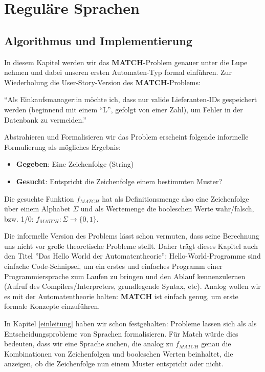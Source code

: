 \chapter{Reguläre Sprachen}
\section{Algorithmus und Implementierung}
In diesem Kapitel werden wir das \textbf{MATCH}-Problem genauer unter die Lupe nehmen
und dabei unseren ersten Automaten-Typ formal einführen.
Zur Wiederholung die User-Story-Version des \textbf{MATCH}-Problems:
\begin{center}
``Als Einkaufsmanager:in möchte ich, dass nur valide Lieferanten-IDs gespeichert werden
(beginnend mit einem ``L'', gefolgt von einer Zahl),
um Fehler in der Datenbank zu vermeiden.''
\end{center}
Abstrahieren und Formalisieren wir das Problem erscheint folgende informelle Formulierung
als mögliches Ergebnis:
\begin{itemize}
\item \textbf{Gegeben}: Eine Zeichenfolge (String)
\item \textbf{Gesucht}: Entspricht die Zeichenfolge einem bestimmten Muster?
\end{itemize}
Die gesuchte Funktion $f_{MATCH}$ hat als Definitionsmenge also eine Zeichenfolge
über einem Alphabet $\Sigma$ und als Wertemenge die booleschen Werte wahr/falsch,
bzw. 1/0: $f_{MATCH}: \Sigma \rightarrow \{0,1\}$.

Die informelle Version des Problems lässt schon vermuten,
dass seine Berechnung uns nicht vor große theoretische Probleme stellt.
Daher trägt dieses Kapitel auch den Titel ''Das Hello World der Automatentheorie'':
Hello-World-Programme sind einfache Code-Schnipsel,
um ein erstes und einfaches Programm einer Programmiersprache zum Laufen zu bringen
und den Ablauf kennenzulernen (Aufruf des Compilers/Interpreters, grundlegende Syntax, etc).
Analog wollen wir es mit der Automatentheorie halten:
\textbf{MATCH} ist einfach genug, um erste formale Konzepte einzuführen.



In Kapitel \autoref{einleitung} haben wir schon festgehalten:
Probleme lassen sich als als Entscheidungsprobleme von Sprachen formalisieren.
Für Match würde dies bedeuten, dass wir eine Sprache suchen,
die analog zu $f_{MATCH}$ genau die Kombinationen von Zeichenfolgen und booleschen Werten beinhaltet,
die anzeigen, ob die Zeichenfolge nun einem Muster entspricht oder nicht.

